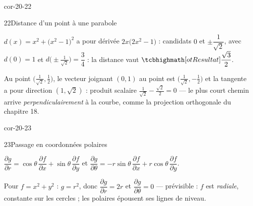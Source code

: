 \begin{blocLivre}{cor-20-22}
\begin{corrige}{22}{Distance d'un point à une parabole}
\begin{questions}
  \item $d(x)=x^{2}+\bigl(x^{2}-1\bigr)^{2}$ a pour dérivée
    $2x\bigl(2x^{2}-1\bigr)$ : candidats $0$ et
    $\pm\dfrac{1}{\sqrt2}$, avec $d(0)=1$ et
    $d\bigl(\pm\tfrac{1}{\sqrt2}\bigr)=\dfrac34$ : la distance vaut
    $\res{\dfrac{\sqrt3}{2}}$.
  \item Au point $\bigl(\tfrac{1}{\sqrt2},\tfrac12\bigr)$, le vecteur
    joignant $(0,1)$ au point est
    $\bigl(\tfrac{1}{\sqrt2},-\tfrac12\bigr)$ et la tangente a pour
    direction $(1,\sqrt2)$ : produit scalaire
    $\tfrac{1}{\sqrt2}-\tfrac{\sqrt2}{2}=0$ — le plus court chemin
    arrive \emph{perpendiculairement} à la courbe, comme la projection
    orthogonale du chapitre 18.
\end{questions}
\end{corrige}
\end{blocLivre}

\begin{blocLivre}{cor-20-23}
\begin{corrige}{23}{Passage en coordonnées polaires}
\begin{questions}
  \item $\dfrac{\partial g}{\partial r}
    =\cos\theta\,\dfrac{\partial f}{\partial x}
    +\sin\theta\,\dfrac{\partial f}{\partial y}$ et
    $\dfrac{\partial g}{\partial\theta}
    =-r\sin\theta\,\dfrac{\partial f}{\partial x}
    +r\cos\theta\,\dfrac{\partial f}{\partial y}$.
  \item Pour $f=x^{2}+y^{2}$ : $g=r^{2}$, donc
    $\dfrac{\partial g}{\partial r}=2r$ et
    $\dfrac{\partial g}{\partial\theta}=0$ — prévisible : $f$ est
    \emph{radiale}, constante sur les cercles ; les polaires épousent
    ses lignes de niveau.
\end{questions}
\end{corrige}
\end{blocLivre}


